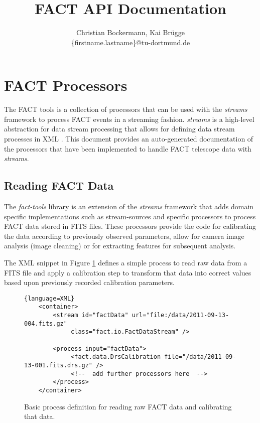\documentclass[german,a4,11pt]{scrartcl}
\title{FACT API Documentation}
\author{\large Christian Bockermann, Kai Br\"{u}gge \\ \large{\{{\ttfamily firstname.lastname}\}{\ttfamily @tu-dortmund.de}}}
\begin{document}
\maketitle

\section{FACT Processors}
The FACT tools is a collection of processors that can be used with the
{\em streams} framework to process FACT events in a streaming
fashion. {\em streams} is a high-level abstraction for data stream
processing that allows for defining data stream processes in XML
\cite{streams:tr}. This document provides an auto-generated
documentation of the processors that have been implemented to handle
FACT telescope data with {\em streams}.

\subsection{Reading FACT Data}
The {\em fact-tools} library is an extension of the {\em streams}
framework that adds domain specific implementations such as
stream-sources and specific processors to process FACT data stored in
FITS files. These processors provide the code for calibrating the data
according to previously observed parameters, allow for camera image
analysis (image cleaning) or for extracting features for subsequent
analysis.

The XML snippet in Figure \ref{fig:readFACTxml} defines a simple process to
read raw data from a FITS file and apply a calibration step to transform that
data into correct values based upon previously recorded calibration parameters.

\begin{figure}[h!]
\begin{lstlisting}{language=XML}
    <container>
        <stream id="factData" url="file:/data/2011-09-13-004.fits.gz"
             class="fact.io.FactDataStream" />

        <process input="factData">
             <fact.data.DrsCalibration file="/data/2011-09-13-001.fits.drs.gz" />
             <!--  add further processors here  -->
        </process>
    </container>
\end{lstlisting}
\caption{\label{fig:readFACTxml}Basic process definition for reading raw FACT data
and calibrating that data.}
\end{figure}
\end{document}
